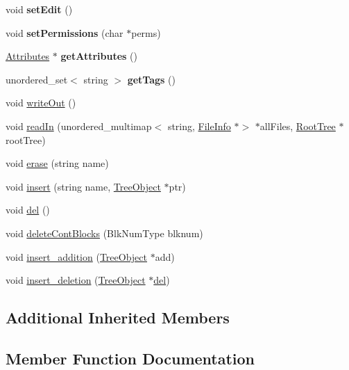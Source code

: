 \begin{DoxyCompactItemize}
void {\bfseries set\+Edit} ()
\item 
\mbox{\label{classFileInfo_ab2b69861ecef1b8e0f465906c8eaa7a7}} 
void {\bfseries set\+Permissions} (char $\ast$perms)
\item 
\mbox{\label{classFileInfo_abc9f651fdf3daf17e5526628b9edc272}} 
\mbox{\hyperlink{classAttributes}{Attributes}} $\ast$ {\bfseries get\+Attributes} ()
\item 
\mbox{\label{classFileInfo_a0335ecd3301d3dd709de5e004567fd29}} 
unordered\+\_\+set$<$ string $>$ {\bfseries get\+Tags} ()
\item 
void \mbox{\hyperlink{classFileInfo_a15d8f9279f1d60e4db4618cb81e68414}{write\+Out}} ()
\item 
void \mbox{\hyperlink{classFileInfo_a0e74605dd535e73027ad1c1c6242db09}{read\+In}} (unordered\+\_\+multimap$<$ string, \mbox{\hyperlink{classFileInfo}{File\+Info}} $\ast$$>$ $\ast$all\+Files, \mbox{\hyperlink{classRootTree}{Root\+Tree}} $\ast$root\+Tree)
\item 
void \mbox{\hyperlink{classFileInfo_ae058242283d3317eaf2b79428e6137f6}{erase}} (string name)
\item 
void \mbox{\hyperlink{classFileInfo_ad93a84b63e417b07aa68b619051ab746}{insert}} (string name, \mbox{\hyperlink{classTreeObject}{Tree\+Object}} $\ast$ptr)
\item 
void \mbox{\hyperlink{classFileInfo_a2ca34d945ed1208f227a249ba72ee427}{del}} ()
\item 
void \mbox{\hyperlink{classFileInfo_a530a418e213a0a945b75ee1dcb8f6acb}{delete\+Cont\+Blocks}} (Blk\+Num\+Type blknum)
\item 
void \mbox{\hyperlink{classFileInfo_a7f788f31521c535646eebfa9959bbb24}{insert\+\_\+addition}} (\mbox{\hyperlink{classTreeObject}{Tree\+Object}} $\ast$add)
\item 
void \mbox{\hyperlink{classFileInfo_a278136b1d68f55dc56a4be807076fc0d}{insert\+\_\+deletion}} (\mbox{\hyperlink{classTreeObject}{Tree\+Object}} $\ast$\mbox{\hyperlink{classFileInfo_a2ca34d945ed1208f227a249ba72ee427}{del}})
\end{DoxyCompactItemize}
\subsection*{Additional Inherited Members}


\subsection{Member Function Documentation}
\mbox{\label{classFileInfo_a2ca34d945ed1208f227a249ba72ee427}} 
